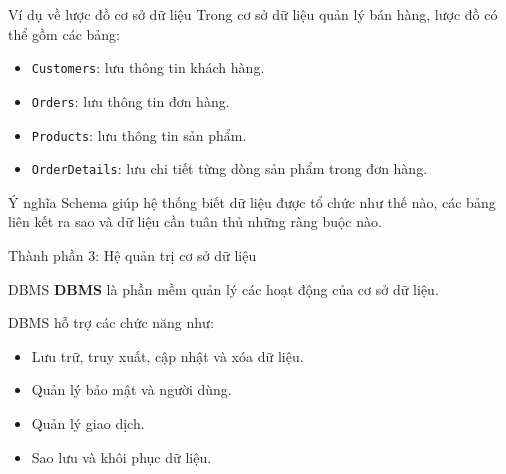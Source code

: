 ﻿\documentclass[aspectratio=169,11pt]{beamer}
\newcommand{\keyword}[1]{\textcolor{accent}{\textbf{#1}}}
\newcommand{\tightlist}{\setlength{\itemsep}{2pt}\setlength{\parskip}{0pt}}
\begin{document}
\begin{frame}{Ví dụ về lược đồ cơ sở dữ liệu}
\small
Trong cơ sở dữ liệu quản lý bán hàng, lược đồ có thể gồm các bảng:

\begin{itemize}
\tightlist
  \item \texttt{Customers}: lưu thông tin khách hàng.
  \item \texttt{Orders}: lưu thông tin đơn hàng.
  \item \texttt{Products}: lưu thông tin sản phẩm.
  \item \texttt{OrderDetails}: lưu chi tiết từng dòng sản phẩm trong đơn hàng.
\end{itemize}

\begin{block}{Ý nghĩa}
Schema giúp hệ thống biết dữ liệu được tổ chức như thế nào, các bảng liên kết ra sao và dữ liệu cần tuân thủ những ràng buộc nào.
\end{block}
\end{frame}

\begin{frame}{Thành phần 3: Hệ quản trị cơ sở dữ liệu}
\small
\begin{block}{DBMS}
\keyword{DBMS} là phần mềm quản lý các hoạt động của cơ sở dữ liệu.
\end{block}

DBMS hỗ trợ các chức năng như:
\begin{itemize}
\tightlist
  \item Lưu trữ, truy xuất, cập nhật và xóa dữ liệu.
  \item Quản lý bảo mật và người dùng.
  \item Quản lý giao dịch.
  \item Sao lưu và khôi phục dữ liệu.
\end{itemize}
\end{frame}
\end{document}
